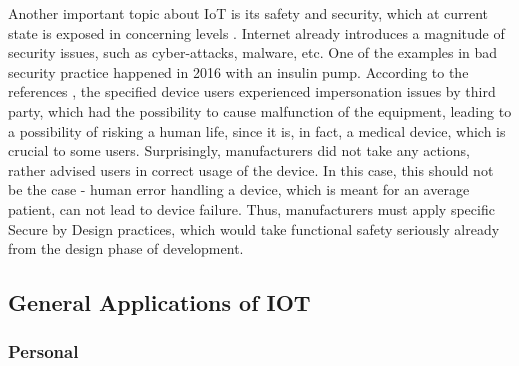 \documentclass[conference]{IEEEtran}
\begin{document}
Another important topic about IoT is its safety and security, which at current state is exposed in concerning levels \cite{hayakawa_proposal_2018}. Internet already introduces a magnitude of security issues, such as cyber-attacks, malware, etc.
One of the examples in bad security practice happened in 2016 with an insulin pump. According to the references \cite{hayakawa_proposal_2018}, the specified device users experienced impersonation issues by third party, which had the possibility to cause malfunction of the equipment, leading to a possibility of risking a human life, since it is, in fact, a medical device, which is crucial to some users. Surprisingly, manufacturers did not take any actions, rather advised users in correct usage of the device. In this case, this should not be the case - human error handling a device, which is meant for an average patient, can not lead to device failure. Thus, manufacturers must apply specific Secure by Design practices, which would take functional safety seriously already from the design phase of development.

\subsection{General Applications of IOT}

\subsubsection{Personal}
\end{document}
